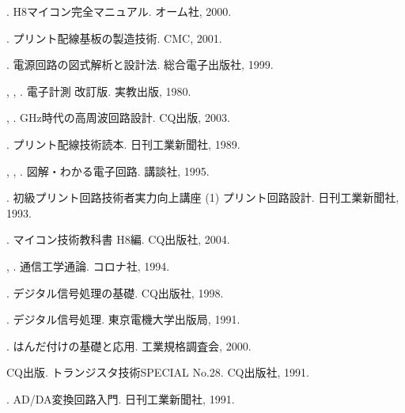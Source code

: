 \documentclass[twocolumn]{jsarticle}
\begin{document}
\begin{hissu}
\begin{thebibliography}{10}
{}{}.
\newblock H8マイコン完全マニュアル.
\newblock オーム社, 2000.

{}{}.
\newblock プリント配線基板の製造技術.
\newblock CMC, 2001.

{}{}.
\newblock 電源回路の図式解析と設計法.
\newblock 総合電子出版社, 1999.

{}{},
  {}{},
  {}{}.
\newblock 電子計測 改訂版.
\newblock 実教出版, 1980.

{}{},
  {}{}.
\newblock GHz時代の高周波回路設計.
\newblock CQ出版, 2003.

{}{}.
\newblock プリント配線技術読本.
\newblock 日刊工業新聞社, 1989.

{}{},
  {}{},
  {}{}.
\newblock 図解・わかる電子回路.
\newblock 講談社, 1995.

{}{}.
\newblock 初級プリント回路技術者実力向上講座 (1) プリント回路設計.
\newblock 日刊工業新聞社, 1993.

{}{}.
\newblock マイコン技術教科書 H8編.
\newblock CQ出版社, 2004.

{}{},
  {}{}.
\newblock 通信工学通論.
\newblock コロナ社, 1994.

{}{}.
\newblock デジタル信号処理の基礎.
\newblock CQ出版社, 1998.

{}{}.
\newblock デジタル信号処理.
\newblock 東京電機大学出版局, 1991.

{}{}.
\newblock はんだ付けの基礎と応用.
\newblock 工業規格調査会, 2000.

CQ出版.
\newblock トランジスタ技術SPECIAL No.28.
\newblock CQ出版社, 1991.

{}{}.
\newblock AD/DA変換回路入門.
\newblock 日刊工業新聞社, 1991.

\end{thebibliography}
\end{hissu}
\end{document}
